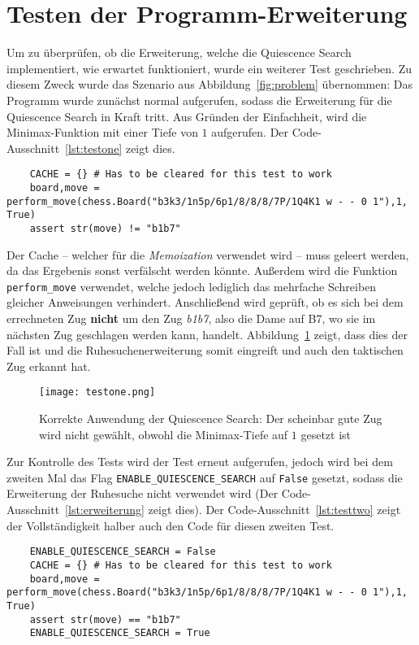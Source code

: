 \section{Testen der Programm-Erweiterung}
Um zu überprüfen, ob die Erweiterung, welche die Quiescence Search implementiert, wie erwartet funktioniert, wurde ein weiterer Test geschrieben. Zu diesem Zweck wurde das Szenario aus Abbildung~\ref{fig:problem} übernommen: Das Programm wurde zunächst normal aufgerufen, sodass die Erweiterung für die Quiescence Search in Kraft tritt. Aus Gründen der Einfachheit, wird die Minimax-Funktion mit einer Tiefe von $1$ aufgerufen. Der Code-Ausschnitt~\ref{lst:testone} zeigt dies.

\begin{lstlisting}[caption=Test für die Quiescence Search (normaler Aufruf), label=lst:testone]
	%%time
	CACHE = {} # Has to be cleared for this test to work
	board,move = perform_move(chess.Board("b3k3/1n5p/6p1/8/8/8/7P/1Q4K1 w - - 0 1"),1, True)
	assert str(move) != "b1b7"
\end{lstlisting}

Der Cache -- welcher für die \textit{Memoization} verwendet wird -- muss geleert werden, da das Ergebenis sonst verfälscht werden könnte. Außerdem wird die Funktion \texttt{perform\_move} verwendet, welche jedoch lediglich das mehrfache Schreiben gleicher Anweisungen verhindert. Anschließend wird geprüft, ob es sich bei dem errechneten Zug \textbf{nicht} um den Zug \textit{b1b7}, also die Dame auf B7, wo sie im nächsten Zug geschlagen werden kann, handelt. Abbildung~\ref{fig:testone} zeigt, dass dies der Fall ist und die Ruhesuchenerweiterung somit eingreift und auch den taktischen Zug erkannt hat.

\begin{figure}[H]
	\texttt{[image: testone.png]}
	\caption{Korrekte Anwendung der Quiescence Search: Der scheinbar gute Zug wird nicht gewählt, obwohl die Minimax-Tiefe auf $1$ gesetzt ist}
	\label{fig:testone}
\end{figure}

Zur Kontrolle des Tests wird der Test erneut aufgerufen, jedoch wird bei dem zweiten Mal das Flag \texttt{ENABLE\_QUIESCENCE\_SEARCH} auf \texttt{False} gesetzt, sodass die Erweiterung der Ruhesuche nicht verwendet wird (Der Code-Ausschnitt~\ref{lst:erweiterung} zeigt dies). Der Code-Ausschnitt~\ref{lst:testtwo} zeigt der Vollständigkeit halber auch den Code für diesen zweiten Test.

\begin{lstlisting}[caption=Test für die Quiescence Search (Aufruf mit deaktivierter Ruhesuche), label=lst:testtwo]
	%%time
	ENABLE_QUIESCENCE_SEARCH = False
	CACHE = {} # Has to be cleared for this test to work
	board,move = perform_move(chess.Board("b3k3/1n5p/6p1/8/8/8/7P/1Q4K1 w - - 0 1"),1, True)
	assert str(move) == "b1b7"
	ENABLE_QUIESCENCE_SEARCH = True
\end{lstlisting}

